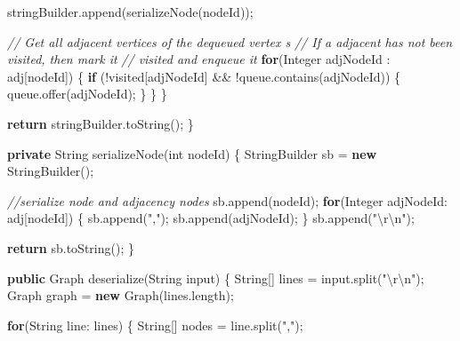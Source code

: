 \documentclass[]{book}
\newenvironment{Shaded}{\begin{snugshade}}{\end{snugshade}}
\newcommand{\BuiltInTok}[1]{#1}
\newcommand{\CommentTok}[1]{\textcolor[rgb]{0.56,0.35,0.01}{\textit{#1}}}
\newcommand{\DataTypeTok}[1]{\textcolor[rgb]{0.13,0.29,0.53}{#1}}
\newcommand{\FunctionTok}[1]{\textcolor[rgb]{0.00,0.00,0.00}{#1}}
\newcommand{\KeywordTok}[1]{\textcolor[rgb]{0.13,0.29,0.53}{\textbf{#1}}}
\newcommand{\NormalTok}[1]{#1}
\newcommand{\SpecialCharTok}[1]{\textcolor[rgb]{0.00,0.00,0.00}{#1}}
\newcommand{\StringTok}[1]{\textcolor[rgb]{0.31,0.60,0.02}{#1}}
\begin{document}
\begin{Shaded}
\begin{Highlighting}[]
\NormalTok{            stringBuilder.}\FunctionTok{append}\NormalTok{(}\FunctionTok{serializeNode}\NormalTok{(nodeId));}

            \CommentTok{// Get all adjacent vertices of the dequeued vertex s}
            \CommentTok{// If a adjacent has not been visited, then mark it}
            \CommentTok{// visited and enqueue it}
            \KeywordTok{for}\NormalTok{(}\BuiltInTok{Integer}\NormalTok{ adjNodeId : adj[nodeId]) \{}
                \KeywordTok{if}\NormalTok{ (!visited[adjNodeId] && !queue.}\FunctionTok{contains}\NormalTok{(adjNodeId)) \{}
\NormalTok{                    queue.}\FunctionTok{offer}\NormalTok{(adjNodeId);}
\NormalTok{                \}}
\NormalTok{            \}}
\NormalTok{        \}}

        \KeywordTok{return}\NormalTok{ stringBuilder.}\FunctionTok{toString}\NormalTok{();}
\NormalTok{    \}}

    \KeywordTok{private} \BuiltInTok{String} \FunctionTok{serializeNode}\NormalTok{(}\DataTypeTok{int}\NormalTok{ nodeId) \{}
        \BuiltInTok{StringBuilder}\NormalTok{ sb = }\KeywordTok{new} \BuiltInTok{StringBuilder}\NormalTok{();}

        \CommentTok{//serialize node and adjacency nodes}
\NormalTok{        sb.}\FunctionTok{append}\NormalTok{(nodeId);}
        \KeywordTok{for}\NormalTok{(}\BuiltInTok{Integer}\NormalTok{ adjNodeId: adj[nodeId]) \{}
\NormalTok{            sb.}\FunctionTok{append}\NormalTok{(}\StringTok{","}\NormalTok{);}
\NormalTok{            sb.}\FunctionTok{append}\NormalTok{(adjNodeId);}
\NormalTok{        \}}
\NormalTok{        sb.}\FunctionTok{append}\NormalTok{(}\StringTok{"}\SpecialCharTok{\textbackslash{}r\textbackslash{}n}\StringTok{"}\NormalTok{);}

        \KeywordTok{return}\NormalTok{ sb.}\FunctionTok{toString}\NormalTok{();}
\NormalTok{    \}}

    \KeywordTok{public}\NormalTok{ Graph }\FunctionTok{deserialize}\NormalTok{(}\BuiltInTok{String}\NormalTok{ input) \{}
        \BuiltInTok{String}\NormalTok{[] lines = input.}\FunctionTok{split}\NormalTok{(}\StringTok{"}\SpecialCharTok{\textbackslash{}r\textbackslash{}n}\StringTok{"}\NormalTok{);}
\NormalTok{        Graph graph = }\KeywordTok{new} \FunctionTok{Graph}\NormalTok{(lines.}\FunctionTok{length}\NormalTok{);}

        \KeywordTok{for}\NormalTok{(}\BuiltInTok{String}\NormalTok{ line: lines) \{}
            \BuiltInTok{String}\NormalTok{[] nodes = line.}\FunctionTok{split}\NormalTok{(}\StringTok{","}\NormalTok{);}


\end{Highlighting}
\end{Shaded}
\end{document}
